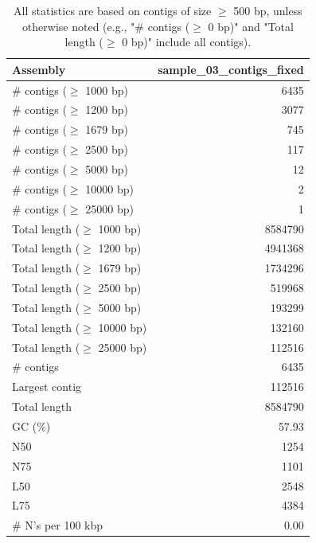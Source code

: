 \documentclass[12pt,a4paper]{article}
\begin{document}
\begin{table}[ht]
\begin{center}
\caption{All statistics are based on contigs of size $\geq$ 500 bp, unless otherwise noted (e.g., "\# contigs ($\geq$ 0 bp)" and "Total length ($\geq$ 0 bp)" include all contigs).}
\begin{tabular}{|l*{1}{|r}|}
\hline
Assembly & sample\_03\_contigs\_fixed \\ \hline
\# contigs ($\geq$ 1000 bp) & 6435 \\ \hline
\# contigs ($\geq$ 1200 bp) & 3077 \\ \hline
\# contigs ($\geq$ 1679 bp) & 745 \\ \hline
\# contigs ($\geq$ 2500 bp) & 117 \\ \hline
\# contigs ($\geq$ 5000 bp) & 12 \\ \hline
\# contigs ($\geq$ 10000 bp) & 2 \\ \hline
\# contigs ($\geq$ 25000 bp) & 1 \\ \hline
Total length ($\geq$ 1000 bp) & 8584790 \\ \hline
Total length ($\geq$ 1200 bp) & 4941368 \\ \hline
Total length ($\geq$ 1679 bp) & 1734296 \\ \hline
Total length ($\geq$ 2500 bp) & 519968 \\ \hline
Total length ($\geq$ 5000 bp) & 193299 \\ \hline
Total length ($\geq$ 10000 bp) & 132160 \\ \hline
Total length ($\geq$ 25000 bp) & 112516 \\ \hline
\# contigs & 6435 \\ \hline
Largest contig & 112516 \\ \hline
Total length & 8584790 \\ \hline
GC (\%) & 57.93 \\ \hline
N50 & 1254 \\ \hline
N75 & 1101 \\ \hline
L50 & 2548 \\ \hline
L75 & 4384 \\ \hline
\# N's per 100 kbp & 0.00 \\ \hline
\end{tabular}
\end{center}
\end{table}
\end{document}

